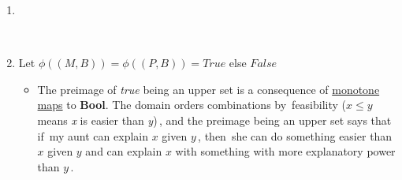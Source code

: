 \begin{enumerate}
    \item  \,\,
    \item  Let $\phi((M,B))=\phi((P,B))=True$ else $False$
          \begin{itemize}
            \item The preimage of \emph{true} being an upper set is a consequence of \href{doc/1 math/Seven Sketches in Compositionality/Chapter 1: Generative Effects/4 Monotone maps/1 Monotone map}{monotone maps} to \textbf{Bool}. The domain orders combinations by \,feasibility ($x\leq y$ means \emph{x} is easier than \emph{y})\,, and the preimage being an upper set says that if \,my aunt can explain $x$ given $y$\,, then \,she can do something easier than $x$ given $y$ and can explain $x$ with something with more explanatory power than $y$\,.
          \end{itemize}
  \end{enumerate}

